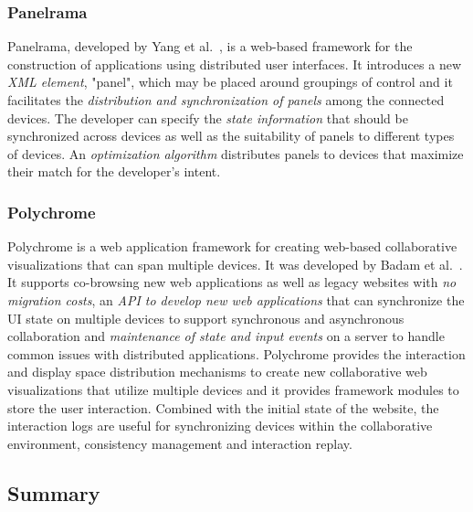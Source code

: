 \subsubsection{Panelrama}

Panelrama, developed by Yang et al.~\cite{panelrama2014}, is a web-based framework for the construction of applications using distributed user interfaces. It introduces a new \emph{XML element}, "panel", which may be placed around groupings of control and it facilitates the \emph{distribution and synchronization of panels} among the connected devices. The developer can specify the \emph{state information} that should be synchronized across devices as well as the suitability of panels to different types of devices. An \emph{optimization algorithm} distributes panels to devices that maximize their match for the developer's intent.

\subsubsection{Polychrome}

Polychrome is a web application framework for creating web-based collaborative visualizations that can span multiple devices. It was developed by Badam et al.~\cite{polychrome2014}. It supports co-browsing new web applications as well as legacy websites with \emph{no migration costs}, an \emph{API to develop new web applications} that can synchronize the UI state on multiple devices to support synchronous and asynchronous collaboration and \emph{maintenance of state and input events} on a server to handle common issues with distributed applications. Polychrome provides the interaction and display space distribution mechanisms to create new collaborative web visualizations that utilize multiple devices and it provides framework modules to store the user interaction. Combined with the initial state of the website, the interaction logs are useful for synchronizing devices within the collaborative environment, consistency management and interaction replay.

\subsection{Summary}

